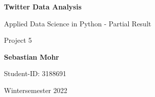 \documentclass[a4paper,10pt]{scrreprt}
\begin{document}
\begin{titlepage}
    \begin{center}
        \vspace*{3cm}
 
        \Huge
        \textbf{Twitter Data Analysis}
 
        \vspace{0.5cm}
        \LARGE
        Applied Data Science in Python - Partial Result

        \vspace{0.5cm}

        \large
        Project 5

        \vspace{1.5cm}
 
        \textbf{Sebastian Mohr}\\

        \vspace{1cm}

        \large 
        Student-ID: 3188691

        \vspace{0.5cm}

        Wintersemester 2022
	\vspace{\fill}
    \end{center}
\end{titlepage}
\end{document}
